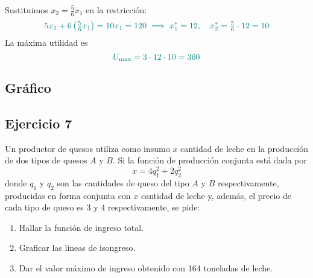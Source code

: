 \documentclass{article}
\begin{document}
Sustituimos \(x_2 = \tfrac{5}{6}x_1\) en la restricción:
\[
\color{teal}
5x_1 + 6\left(\tfrac{5}{6}x_1\right) = 10x_1 = 120
\;\Longrightarrow\;
x_1^* = 12,
\quad
x_2^* = \tfrac{5}{6} \cdot 12 = 10
\]
La máxima utilidad es
\[
\color{teal}
U_{\max} = 3 \cdot 12 \cdot 10 = 360
\]

\subsection*{Gráfico}

\begin{center}
\end{center}

\newpage

\subsection{Ejercicio 7}

Un productor de quesos utiliza como insumo \( x \) cantidad de leche en la producción de dos tipos de quesos \( A \) y \( B \). 
Si la función de producción conjunta está dada por
\[
x = 4q_1^2 + 2q_2^2
\]
donde \( q_1 \) y \( q_2 \) son las cantidades de queso del tipo \( A \) y \( B \) respectivamente, producidas en forma conjunta con \( x \) cantidad de leche y, además, el precio de cada tipo de queso es 3 y 4 respectivamente, se pide:

\begin{enumerate}
    \item Hallar la función de ingreso total.
    \item Graficar las líneas de isongreso.
    \item Dar el valor máximo de ingreso obtenido con 164 toneladas de leche.
\end{enumerate}
\newpage
\end{document}
